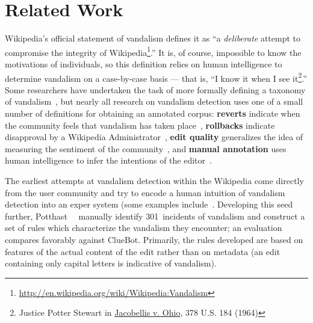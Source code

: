 \section{Related Work}

Wikipedia's official statement of vandalism defines it as
``a \textit{deliberate} attempt to compromise the integrity
of Wikipedia\footnote{
\url{http://en.wikipedia.org/wiki/Wikipedia:Vandalism}
}.''
It is, of course, impossible to know the motivations of individuals,
so this definition relies on human intelligence to determine
vandalism on a case-by-case basis --- that is, ``I know it
when I see it\footnote{Justice Potter Stewart in
\underline{Jacobellis v. Ohio}, 378 U.S. 184 (1964)}.''
Some researchers have undertaken the task of more formally
defining a taxonomy of
vandalism~\cite{Viegas2004,Priedhorsky2007,Chin2010},
but nearly all research on vandalism detection uses one of a small
number of definitions for obtaining an annotated corpus:
\textbf{reverts} indicate when the community feels that vandalism
has taken place~\cite{Smets2008,Itakura2009,Belani2010},
\textbf{rollbacks} indicate disapproval by a Wikipedia
Administrator~\cite{West2010},
\textbf{edit quality} generalizes
the idea of measuring the sentiment of the
community~\cite{www07,Druck2008},
and \textbf{manual annotation} uses human intelligence to
infer the intentions of the editor~\cite{Chin2010,West2010,Potthast2010a}.

The earliest attempts at vandalism detection within the Wikipedia come
directly from the user community and try to encode a human intuition
of vandalism detection into an exper system (some examples
include~\cite{wiki:AntiVandalBot,wiki:MartinBot,wiki:ClueBot,Carter2007}.
Developing this seed further, Potthast~\etal~\cite{Potthast2008}
manually identify 301~incidents of vandalism and construct a set of
rules which characterize the vandalism they encounter; an evaluation
compares favorably against ClueBot.
Primarily, the rules developed are based on features of the actual
content of the edit rather than on metadata (\eg an edit containing
only capital letters is indicative of vandalism).

